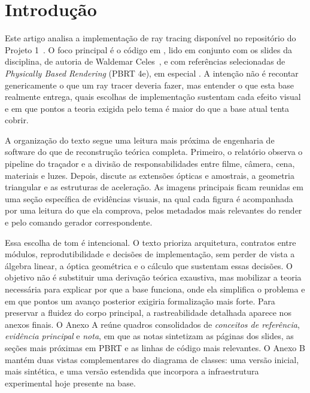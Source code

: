 \documentclass[portuguese]{sbcreviews-2025}%
\newcommand{\pbrtcontentsurl}{https://pbr-book.org/4ed/contents.html}
\newcommand{\pbrtbook}{\emph{Physically Based Rendering} (PBRT 4e)}
\newcommand{\pbrtsecs}[1]{\citep[\href{\pbrtcontentsurl}{Se\c{c}\~oes~#1}]{pharr2023pbrt}}
\begin{document}
\section{Introdução}
\label{sec:introducao-v3}

Este artigo analisa a implementação de ray tracing disponível no repositório do Projeto 1~\citep{inf2608projectrepo}. O foco principal é o código em , lido em conjunto com os slides da disciplina, de autoria de Waldemar Celes~\citep{inf2608slides04,inf2608slides05,inf2608slides06}, e com referências selecionadas de \pbrtbook, em especial \pbrtsecs{1.2, 3.5, 3.7, 5.2, 7.3, 8.1, 8.5, 9.3, 9.5, 11.2 e 12.4}. A intenção não é recontar genericamente o que um ray tracer deveria fazer, mas entender o que esta base realmente entrega, quais escolhas de implementação sustentam cada efeito visual e em que pontos a teoria exigida pelo tema é maior do que a base atual tenta cobrir.

A organização do texto segue uma leitura mais próxima de engenharia de software do que de reconstrução teórica completa. Primeiro, o relatório observa o pipeline do traçador e a divisão de responsabilidades entre filme, câmera, cena, materiais e luzes. Depois, discute as extensões ópticas e amostrais, a geometria triangular e as estruturas de aceleração. As imagens principais ficam reunidas em uma seção específica de evidências visuais, na qual cada figura é acompanhada por uma leitura do que ela comprova, pelos metadados mais relevantes do render e pelo comando gerador correspondente.

Essa escolha de tom é intencional. O texto prioriza arquitetura, contratos entre módulos, reprodutibilidade e decisões de implementação, sem perder de vista a álgebra linear, a óptica geométrica e o cálculo que sustentam essas decisões. O objetivo não é substituir uma derivação teórica exaustiva, mas mobilizar a teoria necessária para explicar por que a base funciona, onde ela simplifica o problema e em que pontos um avanço posterior exigiria formalização mais forte. Para preservar a fluidez do corpo principal, a rastreabilidade detalhada aparece nos anexos finais. O Anexo A reúne quadros consolidados de \emph{conceitos de referência}, \emph{evidência principal} e \emph{nota}, em que as notas sintetizam as páginas dos slides, as seções mais próximas em PBRT e as linhas de código mais relevantes. O Anexo B mantém duas vistas complementares do diagrama de classes: uma versão inicial, mais sintética, e uma versão estendida que incorpora a infraestrutura experimental hoje presente na base.
\end{document}
